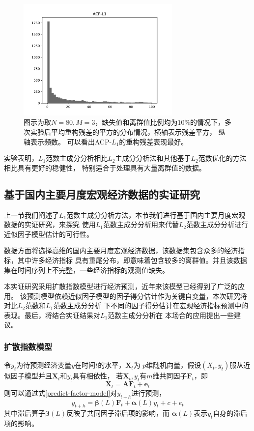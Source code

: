 \begin{figure}[H]
\begin{minipage}[t]{0.48\textwidth}
    \end{minipage}
    \begin{minipage}[t]{0.48\textwidth}
    \includegraphics[width=8cm]{pics/lab1/acp-l1.pdf}
    \end{minipage}
    \caption{\small 图示为取$N = 80, M=3$，缺失值和离群值比例均为$10\%$的情况下，多次实验后平均重构残差的平方的分布情况，横轴表示残差平方，
    纵轴表示频数。
    可以看出ACP-$L_1$的重构残差表现最好。}
\end{figure}

实验表明，$L_1$范数主成分分析相比$L_2$主成分分析法和其他基于$L_2$范数优化的方法相比具有更好的稳健性，
特别适合于处理具有大量离群值的数据。

\subsection{基于国内主要月度宏观经济数据的实证研究}
上一节我们阐述了$L_1$范数主成分分析方法，本节我们进行基于国内主要月度宏观数据的实证研究，来探究
使用$L_1$范数主成分分析用来代替$L_2$范数主成分分析进行近似因子模型估计的可行性。

数据方面将选择高维的国内主要月度宏观经济数据，该数据集包含众多的经济指标，其中许多经济指标
具有重尾分布，即意味着包含较多的离群值。并且该数据集在时间序列上不完整，一些经济指标的观测值缺失。

本实证研究采用扩散指数模型进行经济预测\cite{stock2002macroeconomic}，近年来该模型已经得到了广泛的应用。
该预测模型依赖近似因子模型的因子得分估计作为关键自变量，本次研究将对比$L_2$范数和$L_1$范数主成分分析
下不同的因子得分估计在宏观经济指标预测中的表现。最后，将结合实证结果对$L_1$范数主成分分析在
本场合的应用提出一些建议。

\subsubsection{扩散指数模型}
令$y_t$为待预测经济变量$y$在时间$t$的水平，$\bm{X}_t$为
$p$维随机向量，假设$(X_t,y_t)$服从近似因子模型并且$\bm{X}_t$和$y_t$具有相依性，
若$\bm{X}_t, y_t$有$m$维共同因子$\bm{F}_t$，即
\begin{equation}
    \bm{X}_t = \bm{A}\bm{F}_t + \bm{e}_t
\end{equation}
则可以通过式\eqref{predict-factor-model}对$y_{t+h}$进行预测，
\begin{equation}\label{predict-factor-model}
    y_{t+h} = \bm{\beta}(L)\bm{F}_t + \bm{\alpha}(L)y_t + c + e_t
\end{equation}
其中滞后算子$\bm{\beta}(L)$反映了共同因子滞后项的影响，而
$\bm{\alpha}(L)$表示$y_t$自身的滞后项的影响。

